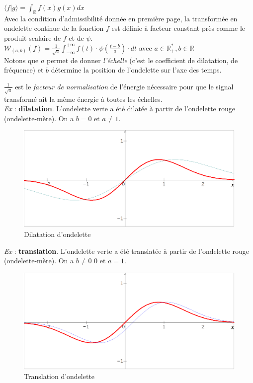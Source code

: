 \documentclass{article}
\begin{document}
$\displaystyle \langle f|g \rangle = \int_{\mathbb{R}} f(x)g(x)dx$ \\

Avec la condition d’admissibilité donnée en première page, la transformée en ondelette continue de la fonction $f$ est définie à facteur constant près comme le produit scalaire de $f$ et de $\psi$. \\

$\displaystyle \mathcal{W}_{(a,b)}(f)= \frac{1}{\sqrt{a}}\int_{-\infty}^{+\infty}f(t)\cdot\psi(\frac{t - b}{a})\cdot dt $ avec $a \in \mathbb{R}_{+}^{*}, b \in \mathbb{R}$ \\

Notons que $a$ permet de donner \textit{l’échelle} (c’est le coefficient de dilatation, de fréquence) et $b$ détermine la position de l’ondelette sur l’axe des temps.

$\frac{1}{\sqrt{a}}$ est le \textit{facteur de normalisation} de l'énergie nécessaire pour que le signal transformé ait la même énergie à toutes les échelles. \\

\textit{Ex} : \textbf{dilatation}.
L’ondelette verte a été dilatée à partir de l’ondelette rouge (ondelette-mère). On a $b = 0$ et $a \neq 1$. \\

\begin{figure}[!h]
\centering
\includegraphics[scale=0.22]{images/dilatation.png}
\caption{Dilatation d'ondelette}
\label{dilat}
\end{figure}

\textit{Ex} : \textbf{translation}.
L’ondelette verte a été translatée à partir de l’ondelette rouge (ondelette-mère). On a $b \neq 0$ 0 et $a = 1$.

\begin{figure}[!h]
\centering
\includegraphics[scale=0.22]{images/translation.png}
\caption{Translation d'ondelette}
\label{translat}
\end{figure}
\end{document}
